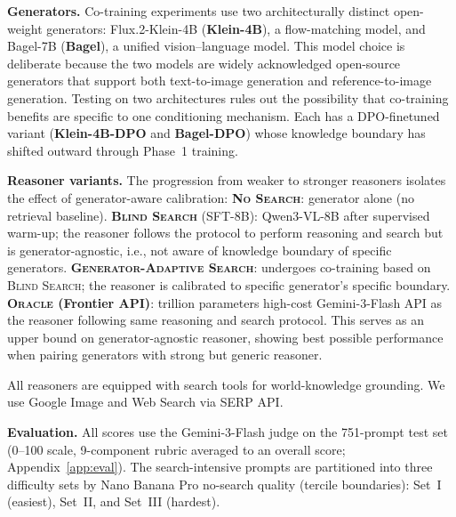 \documentclass{article}
\newcommand{\CondNS}{\textsc{No Search}}
\newcommand{\CondGS}{\textsc{Blind Search}}
\newcommand{\CondGAS}{\textsc{Generator-Adaptive Search}}
\begin{document}

\textbf{Generators.}
Co-training experiments use two architecturally distinct open-weight generators: Flux.2-Klein-4B (\textbf{Klein-4B}), a flow-matching model, and Bagel-7B (\textbf{Bagel}), a unified vision--language model. This model choice is deliberate because the two models are widely acknowledged open-source generators that support both text-to-image generation and reference-to-image generation. 
Testing on two architectures rules out the possibility that co-training benefits are specific to one conditioning mechanism.
Each has a DPO-finetuned variant (\textbf{Klein-4B-DPO} and \textbf{Bagel-DPO}) whose knowledge boundary has shifted outward through Phase~1 training.

\textbf{Reasoner variants.}
The progression from weaker to stronger reasoners isolates the effect of generator-aware calibration:
\textbf{\CondNS}: generator alone (no retrieval baseline).
\textbf{\CondGS} (SFT-8B): Qwen3-VL-8B after supervised warm-up; the reasoner follows the protocol to perform reasoning and search but is generator-agnostic, i.e., not aware of knowledge boundary of specific generators.
\textbf{\CondGAS}: undergoes co-training based on \CondGS; the reasoner is calibrated to specific generator's specific boundary.
\textbf{\textsc{Oracle} (Frontier API)}: trillion parameters high-cost Gemini-3-Flash API as the reasoner following same reasoning and search protocol. This serves as an upper bound on generator-agnostic reasoner, showing best possible performance when pairing generators with strong but generic reasoner.

All reasoners are equipped with search tools for world-knowledge grounding. We use Google Image and Web Search via SERP API. 

\textbf{Evaluation.}
All scores use the Gemini-3-Flash judge on the 751-prompt test set (0--100 scale, 9-component rubric averaged to an overall score; Appendix~\ref{app:eval}).
The search-intensive prompts are partitioned into three difficulty sets by Nano Banana Pro no-search quality (tercile boundaries): Set~I (easiest), Set~II, and Set~III (hardest).  
\end{document}
